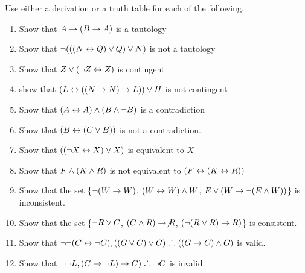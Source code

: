 \noindent\problempart Use either a derivation or a truth table for each of the following. 
\begin{enumerate}%
\item Show that $A \rightarrow (B \rightarrow A)$ is a tautology
\item Show that $\neg (((N \leftrightarrow Q) \vee Q) \vee N)$ is not a tautology
\item Show that $ Z \vee (\neg Z \leftrightarrow Z) $ is contingent
\item show that $ (L \leftrightarrow ((N \rightarrow N) \rightarrow L)) \vee H $ is not contingent
\item Show that $ (A \leftrightarrow A) \wedge (B \wedge \neg B)$ is a contradiction
\item Show that $ (B \leftrightarrow (C \vee B)) $ is not a contradiction.
\item Show that $ ((\neg X \leftrightarrow X) \vee X) $ is equivalent to $X$
\item Show that $F \wedge (K \wedge R) $ is not equivalent to $ (F \leftrightarrow (K \leftrightarrow R)) $
\item Show that the set \{$ \neg (W \rightarrow W)$, $(W \leftrightarrow W) \wedge W$, $E \vee (W \rightarrow \neg (E \wedge W))$\} is inconsistent.
\item Show that the set  \{$\neg R \vee C $, $(C \wedge R) \rightarrow \not R$, $(\neg (R \vee R) \rightarrow R) $\} is consistent.
\item Show that $\neg \neg (C \leftrightarrow \neg C), ((G \vee C) \vee G) \mathrel{\ldotp\dot{}\,\ldotp} ((G \rightarrow C) \wedge G) $ is valid.
\item Show that $ \neg \neg L,  (C \rightarrow \neg L) \rightarrow C) \mathrel{\ldotp\dot{}\,\ldotp} \neg C$ is invalid. 
\end{enumerate}

